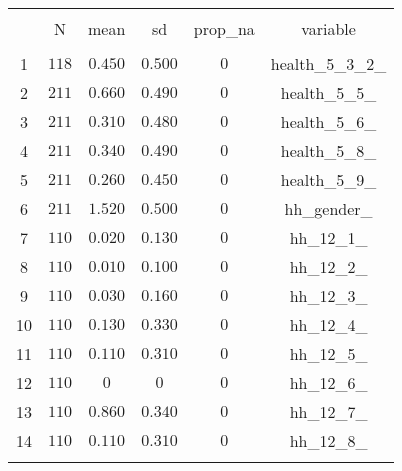 
\begin{table}[!htbp] \centering 
  \caption{} 
  \label{} 
\begin{tabular}{@{\extracolsep{5pt}} cccccc} 
\\[-1.8ex]\hline 
\hline \\[-1.8ex] 
 & N & mean & sd & prop\_na & variable \\ 
\hline \\[-1.8ex] 
1 & $118$ & $0.450$ & $0.500$ & $0$ & health\_5\_3\_2\_ \\ 
2 & $211$ & $0.660$ & $0.490$ & $0$ & health\_5\_5\_ \\ 
3 & $211$ & $0.310$ & $0.480$ & $0$ & health\_5\_6\_ \\ 
4 & $211$ & $0.340$ & $0.490$ & $0$ & health\_5\_8\_ \\ 
5 & $211$ & $0.260$ & $0.450$ & $0$ & health\_5\_9\_ \\ 
6 & $211$ & $1.520$ & $0.500$ & $0$ & hh\_gender\_ \\ 
7 & $110$ & $0.020$ & $0.130$ & $0$ & hh\_12\_1\_ \\ 
8 & $110$ & $0.010$ & $0.100$ & $0$ & hh\_12\_2\_ \\ 
9 & $110$ & $0.030$ & $0.160$ & $0$ & hh\_12\_3\_ \\ 
10 & $110$ & $0.130$ & $0.330$ & $0$ & hh\_12\_4\_ \\ 
11 & $110$ & $0.110$ & $0.310$ & $0$ & hh\_12\_5\_ \\ 
12 & $110$ & $0$ & $0$ & $0$ & hh\_12\_6\_ \\ 
13 & $110$ & $0.860$ & $0.340$ & $0$ & hh\_12\_7\_ \\ 
14 & $110$ & $0.110$ & $0.310$ & $0$ & hh\_12\_8\_ \\ 
\hline \\[-1.8ex] 
\end{tabular} 
\end{table} 
